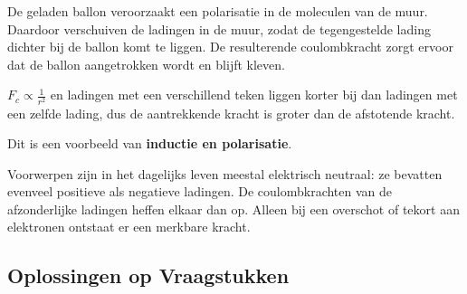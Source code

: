 \begin{ant}\label{opl vH1:ballon}
De geladen ballon veroorzaakt een polarisatie in de moleculen van de muur. Daardoor verschuiven de ladingen in de muur, zodat de tegengestelde lading dichter bij de ballon komt te liggen. De resulterende coulombkracht zorgt ervoor dat de ballon aangetrokken wordt en blijft kleven.

$F_{c}\propto \tfrac{1}{r^{2}} $ en ladingen met een verschillend teken liggen korter bij dan ladingen met een zelfde lading, dus de aantrekkende kracht is groter dan de afstotende kracht.

Dit is een voorbeeld van \textbf{inductie en polarisatie}.\\
\end{ant}

\begin{ant}\label{opl vH1:dagelijksleven}
Voorwerpen zijn in het dagelijks leven meestal elektrisch neutraal: ze bevatten evenveel positieve als negatieve ladingen. De coulombkrachten van de afzonderlijke ladingen heffen elkaar dan op. Alleen bij een overschot of tekort aan elektronen ontstaat er een merkbare kracht.\\
\end{ant}

\subsection{Oplossingen op Vraagstukken}


